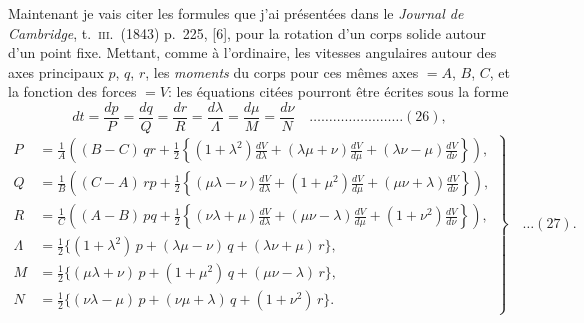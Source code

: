 \documentclass[12pt,a4paper]{article}
\theoremstyle{plain}
\begin{document}
Maintenant je vais citer les formules que j'ai pr\'esent\'ees dans le \textit{Journal de Cambridge}, t.~\textsc{iii}.~(1843) p.~225, [6], pour la rotation d'un corps solide autour d'un point fixe. Mettant, comme \`a l'ordinaire, les vitesses angulaires autour des axes principaux $p$, $q$, $r$, les \textit{moments} du corps pour ces m\^emes axes $= A$, $B$, $C$, et la fonction des forces $= V$: les \'equations cit\'ees pourront \^etre \'ecrites sous la forme
\[
dt = \frac{dp}{P} = \frac{dq}{Q} = \frac{dr}{R} = \frac{d\lambda}{\Lambda} = \frac{d\mu}{M} = \frac{d\nu}{N} \quad \ldots \ldots \ldots \ldots \ldots \ldots \ldots \ldots (26),
\]
\[
\left. \begin{aligned}
P &= \frac{1}{A}\left((B - C)\,qr + \tfrac{1}{2}\left\{(1 + \lambda^2)\frac{dV}{d\lambda} + (\lambda\mu + \nu)\frac{dV}{d\mu} + (\lambda\nu - \mu)\frac{dV}{d\nu}\right\}\right), \\
Q &= \frac{1}{B}\left((C - A)\,rp + \tfrac{1}{2}\left\{(\mu\lambda - \nu)\frac{dV}{d\lambda} + (1 + \mu^2)\frac{dV}{d\mu} + (\mu\nu + \lambda)\frac{dV}{d\nu}\right\}\right), \\
R &= \frac{1}{C}\left((A - B)\,pq + \tfrac{1}{2}\left\{(\nu\lambda + \mu)\frac{dV}{d\lambda} + (\mu\nu - \lambda)\frac{dV}{d\mu} + (1 + \nu^2)\frac{dV}{d\nu}\right\}\right), \\
\Lambda &= \tfrac{1}{2}\{(1 + \lambda^2)\,p + (\lambda\mu - \nu)\,q + (\lambda\nu + \mu)\,r\}, \\
M &= \tfrac{1}{2}\{(\mu\lambda + \nu)\,p + (1 + \mu^2)\,q + (\mu\nu - \lambda)\,r\}, \\
N &= \tfrac{1}{2}\{(\nu\lambda - \mu)\,p + (\nu\mu + \lambda)\,q + (1 + \nu^2)\,r\}.
\end{aligned} \right\} \quad \ldots (27).
\]
\end{document}
